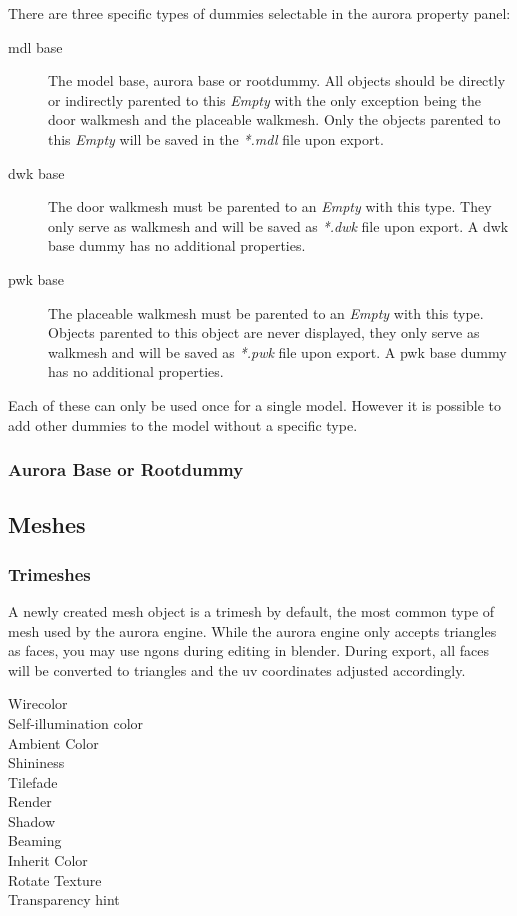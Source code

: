 \documentclass[a4paper]{article}
\begin{document}
There are three specific types of dummies selectable in the aurora property panel:
\begin{description}
    \item[mdl base] The model base, aurora base or rootdummy. All objects should be directly or indirectly parented to this {\itshape{Empty}} with the only exception being the door walkmesh and the placeable walkmesh. Only the objects parented to this {\itshape{Empty}} will be saved in the {\itshape{*.mdl}} file upon export.
    \item[dwk base] The door walkmesh must be parented to an {\itshape{Empty}} with this type. They only serve as walkmesh  and will be saved as {\itshape{*.dwk}} file upon export. A dwk base dummy has no additional properties.
    \item[pwk base] The placeable walkmesh must be parented to an {\itshape{Empty}} with this type. Objects parented to this object are never displayed, they only serve as walkmesh and will be saved as {\itshape{*.pwk}} file upon export. A pwk base dummy has no additional properties.
\end{description}
Each of these can only be used once for a single model. However it is possible to add other dummies to the model without a specific type.

\subsubsection{Aurora Base or Rootdummy}

\subsection{Meshes}


\subsubsection{Trimeshes}
A newly created mesh object is a trimesh by default, the most common type of mesh used by the aurora engine. While the aurora engine only accepts triangles as faces, you may use ngons during editing in blender. During export, all faces will be converted to triangles and the uv coordinates adjusted accordingly.

\begin{description}
    \item[Wirecolor] 
    \item[Self-illumination color]
    \item[Ambient Color] 
    \item[Shininess]
    \item[Tilefade]
    \item[Render]  
    \item[Shadow]
    \item[Beaming]
    \item[Inherit Color]  
    \item[Rotate Texture]
    \item[Transparency hint]      
\end{description}
\end{document}
